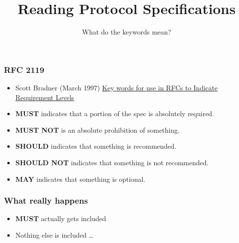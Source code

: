 \documentclass[red]{beamer}
\begin{document}
\title{Reading Protocol Specifications}
\author{What do the keywords mean?}
\date{}
\begin{frame}
\maketitle
\end{frame}

\begin{frame}\frametitle{RFC 2119}
\begin{itemize}
\item Scott Bradner (March 1997) \href{https://datatracker.ietf.org/doc/html/rfc2119}{Key words for use in RFCs to Indicate Requirement Levels}
\pause
\item \textbf{MUST} indicates that a portion of the spec is absolutely required.
\pause
\item \textbf{MUST NOT} is an absolute prohibition of something.
\pause
\item \textbf{SHOULD} indicates that something is recommended.
\pause
\item \textbf{SHOULD NOT} indicates that something is not recommended.
\pause
\item \textbf{MAY} indicates that something is optional.
\end{itemize}
\end{frame}

\begin{frame}\frametitle{What really happens}
\begin{itemize}
\item \textbf{MUST} actually gets included
\pause
\item Nothing else is included \dots
\end{itemize}
\end{frame}
\end{document}
